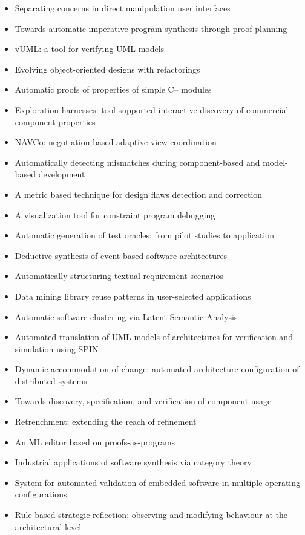 {\begin{itemize}[itemsep=-1ex]
  \item Separating concerns in direct manipulation user interfaces
  \item Towards automatic imperative program synthesis through proof planning
  \item vUML: a tool for verifying UML models
  \item Evolving object-oriented designs with refactorings
  \item Automatic proofs of properties of simple C-- modules
  \item Exploration harnesses: tool-supported interactive discovery of commercial component properties
  \item NAVCo: negotiation-based adaptive view coordination
  \item Automatically detecting mismatches during component-based and model-based development
  \item A metric based technique for design flaws detection and correction
  \item A visualization tool for constraint program debugging
  \item Automatic generation of test oracles: from pilot studies to application
  \item Deductive synthesis of event-based software architectures
  \item Automatically structuring textual requirement scenarios
  \item Data mining library reuse patterns in user-selected applications
  \item Automatic software clustering via Latent Semantic Analysis
  \item Automated translation of UML models of architectures for verification and simulation using SPIN
  \item Dynamic accommodation of change: automated architecture configuration of distributed systems
  \item Towards discovery, specification, and verification of component usage
  \item Retrenchment: extending the reach of refinement
  \item An ML editor based on proofs-as-programs
  \item Industrial applications of software synthesis via category theory
  \item System for automated validation of embedded software in multiple operating configurations
  \item Rule-based strategic reflection: observing and modifying behaviour at the architectural level

\end{itemize}}

